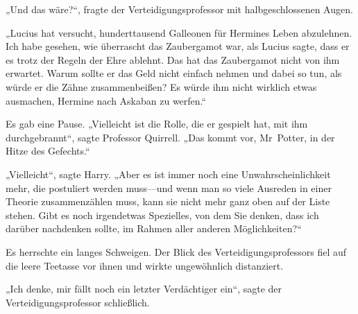 „Und das wäre?“, fragte der Verteidigungsprofessor mit halbgeschlossenen Augen.

„Lucius hat versucht, hunderttausend Galleonen für Hermines Leben abzulehnen. Ich habe gesehen, wie überrascht das Zaubergamot war, als Lucius sagte, dass er es trotz der Regeln der Ehre ablehnt. Das hat das Zaubergamot nicht von ihm erwartet. Warum sollte er das Geld nicht einfach nehmen und dabei so tun, als würde er die Zähne zusammenbeißen? Es würde ihm nicht wirklich etwas ausmachen, Hermine nach Askaban zu werfen.“

Es gab eine Pause. „Vielleicht ist die Rolle, die er gespielt hat, mit ihm durchgebrannt“, sagte Professor Quirrell. „Das kommt vor, Mr~Potter, in der Hitze des Gefechts.“

„Vielleicht“, sagte Harry. „Aber es ist immer noch eine Unwahrscheinlichkeit mehr, die postuliert werden muss—und wenn man so viele Ausreden in einer Theorie zusammenzählen muss, kann sie nicht mehr ganz oben auf der Liste stehen. Gibt es noch irgendetwas Spezielles, von dem Sie denken, dass ich darüber nachdenken sollte, im Rahmen aller anderen Möglichkeiten?“

Es herrschte ein langes Schweigen.
Der Blick des Verteidigungsprofessors fiel auf die leere Teetasse vor ihnen und wirkte ungewöhnlich distanziert.

„Ich denke, mir fällt noch ein letzter Verdächtiger ein“, sagte der Verteidigungsprofessor schließlich.

